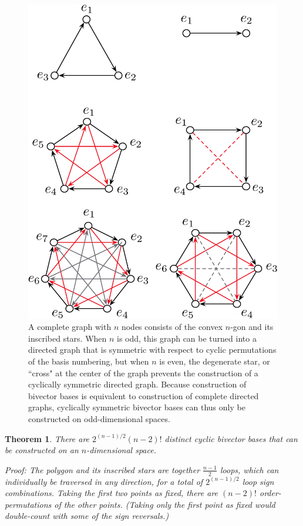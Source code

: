 \documentclass[11pt]{article}
\newtheorem{theorem}{Theorem}[section]
\begin{document}
\begin{figure}[tbp]
\begin{center}
\includegraphics[width=.75\textwidth]{CyclicSymmetricGraphs.pdf}
\caption{A complete graph with $n$ nodes consists of the convex $n$-gon and its inscribed stars. When $n$ is odd, this graph can be turned into a directed graph that is symmetric with respect to cyclic permutations of the basis numbering, but when $n$ is even, the degenerate star, or ``cross" at the center of the graph prevents the construction of a cyclically symmetric directed graph. Because construction of bivector bases is equivalent to construction of complete directed graphs, cyclically symmetric bivector bases can thus only be constructed on odd-dimensional spaces.}
\label{fig:polygonandstars}
\end{center}
\end{figure}




\begin{theorem}{There are $2^{(n-1)/2} (n-2)!$ distinct cyclic bivector bases that can be constructed on an $n$-dimensional space.} \label{thm:numberofcyclicbivectorbases}

Proof: The polygon and its inscribed stars are together $\frac{n-1}{2}$ loops, which can individually be traversed in any direction, for a total of $2^{(n-1)/2}$ loop sign combinations. 
Taking the first two points as fixed, there are $(n-2)!$ order-permutations of the other points. (Taking only the first point as fixed would double-count with some of the sign reversals.)%

\end{theorem}
\end{document}
